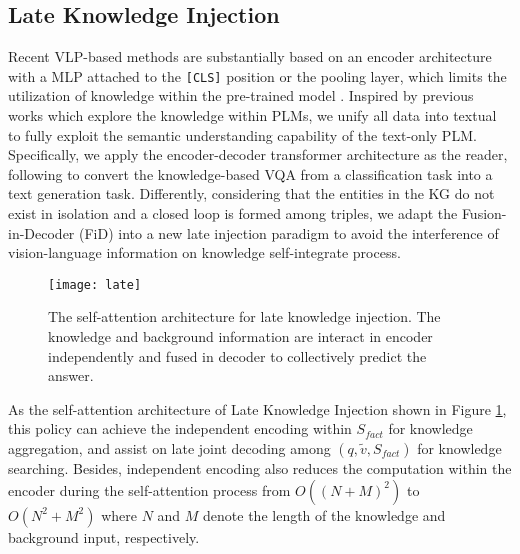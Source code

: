 \documentclass[sigconf]{acmart}
\newcommand{\cjy}[1]{{\color{black}#1}}
\begin{document}
\subsection{Late Knowledge Injection}
Recent VLP-based methods are substantially based on \cjy{an} encoder architecture  with a MLP attached \cjy{to} the {\tt [CLS]} position or the pooling layer, which limits the utilization of knowledge within the pre-trained model \citep{DBLP:conf/acl/GaoFC20}.
Inspired by previous works \citep{DBLP:conf/eacl/HeinzerlingI21,DBLP:conf/acl/CaoLHSYLXX20} \cjy{which explore the knowledge within PLMs}, we unify all data into textual to \cjy{fully} exploit the semantic understanding capability of the text-only PLM.
Specifically, we apply \cjy{the} encoder-decoder transformer architecture as the reader, following \citep{DBLP:conf/icml/ChoLTB21} to convert the knowledge-based VQA from a classification task into a text generation task.
Differently, considering that the entities in the KG do not exist in isolation and a closed loop is formed among triples, 
 we adapt the Fusion-in-Decoder (FiD) \citep{DBLP:conf/eacl/IzacardG21} into a new late injection paradigm to avoid the interference of vision-language information on knowledge self-integrate process.
 \begin{figure}[htbp]
 \vspace{-1mm}
  \texttt{[image: late]}
  \vspace{-1mm}
    \caption{The self-attention architecture for late knowledge injection. The knowledge and background information are interact in encoder independently and fused in decoder to collectively predict the answer.
    } 
  \label{fig:late}
\end{figure}
As the self-attention architecture of Late Knowledge Injection shown in Figure \ref{fig:late}, this policy can achieve the independent encoding within  $S_{fact}$ for knowledge aggregation, and assist on late joint decoding among $(q,\tilde{v},S_{fact})$ for knowledge searching.
Besides, independent encoding also reduces the computation within the encoder during the self-attention process from $O((N+M)^2)$ to $O(N^2+M^2)$ where $N$ and $M$ denote the length of the knowledge and background input, respectively. 
\end{document}
